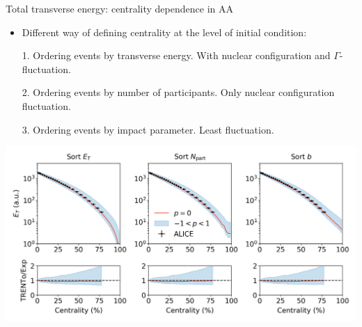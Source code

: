 \documentclass[11pt, aspectratio=169]{beamer}
\begin{document}
\begin{frame}{Total transverse energy: centrality dependence in AA}
\begin{itemize}
\item Different way of defining centrality at the level of initial condition:
\item[1.] Ordering events by transverse energy. With nuclear configuration and $\Gamma$-fluctuation.
\item[2.] Ordering events by number of participants. Only nuclear configuration fluctuation.
\item[3.] Ordering events by impact parameter. Least fluctuation.
\end{itemize}
\includegraphics[width=.7\textwidth]{mult.png}
\end{frame}
\end{document}
